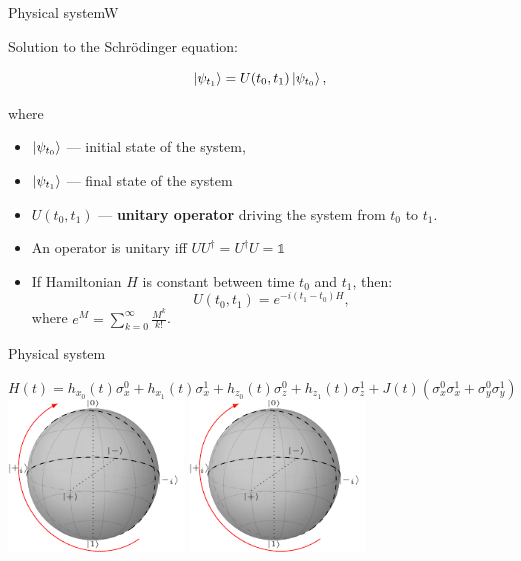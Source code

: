 \begin{frame}{Physical system}W
\begin{block}{Solution to the Schrödinger equation:}
\begin{large}
$$
\ket{\psi_{t_1}} = U(t_0, t_1) \ket{\psi_{t_0}},
$$
\end{large}
where
\begin{itemize}
\item $\ket{\psi_{t_0}}$ --- initial state of the system, 
\item $\ket{\psi_{t_1}}$ --- final state of the system
\item $U(t_0, t_1)$ --- \textbf{unitary operator} driving the system from 
$t_0$ to $t_1$. 
\end{itemize}
\end{block}

\begin{itemize}
\item An operator is unitary iff $UU^\dagger=U^\dagger U=\mathbb{1}$
\framebreak
\item If Hamiltonian $H$ is constant between time $t_0$ and $t_1$, then:
$$
U(t_0, t_1) = e^{-i (t_1-t_0) H },
$$
where $e^M=\sum_{k=0}^\infty \frac{M^k}{k!}$.
\end{itemize}
\end{frame}
\begin{frame}{Physical system}
	\begin{center}
		$H(t) = h_{x_0}(t)\sigma_x^0+
			h_{x_1}(t)\sigma_x^1+
			h_{z_0}(t)\sigma_z^0+
			h_{z_1}(t)\sigma_z^1+
			J(t)\left(\sigma_x^0\sigma_x^{1} + \sigma_y^0\sigma_y^{1}\right)$\\[1cm]
		\includegraphics[width=0.35\textwidth, page=2]{pics/bloch_dynamics.pdf}
		\includegraphics[width=0.35\textwidth, page=1]{pics/bloch_dynamics.pdf}
	\end{center}
\end{frame}
